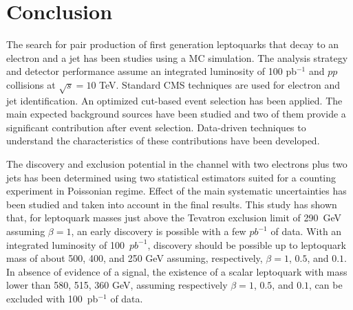 %

\section{Conclusion}

The search for pair production of first generation leptoquarks that decay to
an electron and a jet has been studies using a MC simulation.
The analysis strategy and detector performance assume an integrated luminosity of 100 pb$^{-1}$ and $pp$ collisions 
at $\sqrt{s}=10$ TeV.
Standard CMS techniques are used for electron and jet identification. 
An optimized cut-based event selection has been applied.
The main expected background sources have been studied and two of them provide 
a significant contribution after event selection. 
Data-driven techniques to understand the characteristics of these contributions have been developed.

The discovery and exclusion potential in the channel with two electrons plus two jets has 
been determined using two statistical estimators suited for a counting experiment in Poissonian regime.
Effect of the main systematic uncertainties has been studied and taken into account in the final 
results. This study has shown that, 
for leptoquark masses just above the Tevatron exclusion limit of 290~GeV assuming $\beta=1$, 
an early discovery is possible with a few $pb^{-1}$ of data.
With an integrated luminosity of 100~$pb^{-1}$, discovery should be possible up
to leptoquark mass of about 500, 400, and 250 GeV assuming, respectively, 
$\beta=1$, $0.5$, and $0.1$. 
In absence of evidence of a signal, the existence of a scalar leptoquark 
with mass lower than 580, 515, 360 GeV, assuming respectively 
$\beta=1$, $0.5$, and $0.1$, can be excluded with 100~pb$^{-1}$ of data.




%
